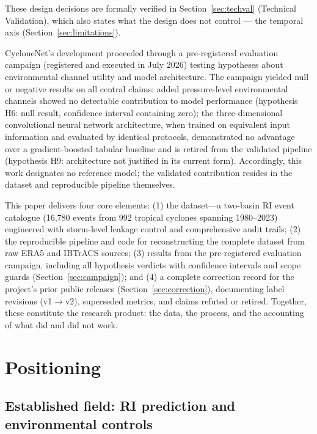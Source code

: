 \documentclass[11pt]{article}
\begin{document}
These design decisions are formally verified in Section~\ref{sec:techval}
(Technical Validation), which also states what the design does not control
--- the temporal axis (Section~\ref{sec:limitations}).

CycloneNet's development proceeded through a pre-registered evaluation
campaign (registered and executed in July 2026) testing hypotheses about
environmental channel utility and model architecture. The campaign yielded
null or negative results on all central claims: added pressure-level
environmental channels showed no detectable contribution to model
performance (hypothesis H6: null result, confidence interval containing
zero); the three-dimensional convolutional neural network architecture, when
trained on equivalent input information and evaluated by identical
protocols, demonstrated no advantage over a gradient-boosted tabular
baseline and is retired from the validated pipeline (hypothesis H9:
architecture not justified in its current form). Accordingly, this work
designates no reference model; the validated contribution resides in the
dataset and reproducible pipeline themselves.

This paper delivers four core elements: (1) the dataset---a two-basin RI
event catalogue (16{,}780 events from 992 tropical cyclones spanning
1980--2023) engineered with storm-level leakage control and comprehensive
audit trails; (2) the reproducible pipeline and code for reconstructing the
complete dataset from raw ERA5 and IBTrACS sources; (3) results from the
pre-registered evaluation campaign, including all hypothesis verdicts with
confidence intervals and scope guards (Section~\ref{sec:campaign}); and (4)
a complete correction record for the project's prior public releases
(Section~\ref{sec:correction}), documenting label revisions (v1$\to$v2),
superseded metrics, and claims refuted or retired. Together, these
constitute the research product: the data, the process, and the accounting
of what did and did not work.

\section{Positioning}
\label{sec:positioning}

\subsection{Established field: RI prediction and environmental controls}
\end{document}

